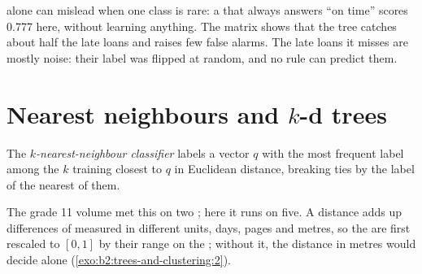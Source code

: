\label{lst:b2:trees-and-clustering:confusion}

\label{out:b2:trees-and-clustering:confusion}

 alone can mislead when one class is rare: a  that always answers ``on time'' scores 0.777 here,
without learning anything. The matrix shows that the tree catches about half the late loans and raises few false alarms.
The late loans it misses are mostly noise: their label was flipped at random, and no rule can predict them.

\section{Nearest neighbours and $k$-d trees}\label{sec:b2:trees-and-clustering:knn}

\begin{definition}\label{def:b2:trees-and-clustering:knn}
The \emph{$k$-nearest-neighbour classifier}
labels a  vector $q$ with the most frequent label among the $k$ training  closest to $q$ in Euclidean
distance, breaking ties by the label of the nearest of them.
\end{definition}

The grade 11 volume met this  on two ; here it runs on five. A distance adds up differences of
 measured in different units, days, pages and metres, so the  are first rescaled to $[0, 1]$ by their
range on the ; without it, the distance in metres would decide alone (\cref{exo:b2:trees-and-clustering:2}).

\label{lst:b2:trees-and-clustering:knn}


